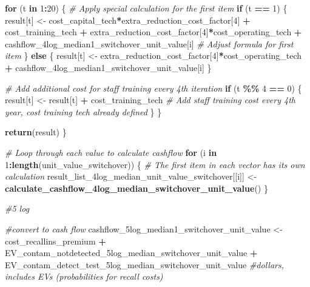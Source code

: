 \documentclass[
]{article}
\newenvironment{Shaded}{\begin{snugshade}}{\end{snugshade}}
\newcommand{\CommentTok}[1]{\textcolor[rgb]{0.56,0.35,0.01}{\textit{#1}}}
\newcommand{\ControlFlowTok}[1]{\textcolor[rgb]{0.13,0.29,0.53}{\textbf{#1}}}
\newcommand{\DecValTok}[1]{\textcolor[rgb]{0.00,0.00,0.81}{#1}}
\newcommand{\FunctionTok}[1]{\textcolor[rgb]{0.13,0.29,0.53}{\textbf{#1}}}
\newcommand{\NormalTok}[1]{#1}
\newcommand{\OtherTok}[1]{\textcolor[rgb]{0.56,0.35,0.01}{#1}}
\newcommand{\SpecialCharTok}[1]{\textcolor[rgb]{0.81,0.36,0.00}{\textbf{#1}}}
\begin{document}
\begin{Shaded}
\begin{Highlighting}[]
  \ControlFlowTok{for}\NormalTok{ (t }\ControlFlowTok{in} \DecValTok{1}\SpecialCharTok{:}\DecValTok{20}\NormalTok{) \{}
    \CommentTok{\# Apply special calculation for the first item}
    \ControlFlowTok{if}\NormalTok{ (t }\SpecialCharTok{==} \DecValTok{1}\NormalTok{) \{}
\NormalTok{      result[t] }\OtherTok{\textless{}{-}}\NormalTok{ cost\_capital\_tech}\SpecialCharTok{*}\NormalTok{extra\_reduction\_cost\_factor[}\DecValTok{4}\NormalTok{] }\SpecialCharTok{+}\NormalTok{ cost\_training\_tech }\SpecialCharTok{+}\NormalTok{ extra\_reduction\_cost\_factor[}\DecValTok{4}\NormalTok{]}\SpecialCharTok{*}\NormalTok{cost\_operating\_tech }\SpecialCharTok{+}\NormalTok{ cashflow\_4log\_median1\_switchover\_unit\_value[i] }\CommentTok{\# Adjust formula for first item}
\NormalTok{    \} }\ControlFlowTok{else}\NormalTok{ \{}
\NormalTok{      result[t] }\OtherTok{\textless{}{-}}\NormalTok{ extra\_reduction\_cost\_factor[}\DecValTok{4}\NormalTok{]}\SpecialCharTok{*}\NormalTok{cost\_operating\_tech }\SpecialCharTok{+}\NormalTok{ cashflow\_4log\_median1\_switchover\_unit\_value[i]}
\NormalTok{    \}}
    
    \CommentTok{\# Add additional cost for staff training every 4th iteration}
    \ControlFlowTok{if}\NormalTok{ (t }\SpecialCharTok{\%\%} \DecValTok{4} \SpecialCharTok{==} \DecValTok{0}\NormalTok{) \{}
\NormalTok{      result[t] }\OtherTok{\textless{}{-}}\NormalTok{ result[t] }\SpecialCharTok{+}\NormalTok{ cost\_training\_tech  }\CommentTok{\# Add staff training cost every 4th year, cost training tech already defined}
\NormalTok{    \}}
\NormalTok{  \}}
  
  \FunctionTok{return}\NormalTok{(result)}
\NormalTok{\}}

\CommentTok{\# Loop through each value to calculate cashflow}
\ControlFlowTok{for}\NormalTok{ (i }\ControlFlowTok{in} \DecValTok{1}\SpecialCharTok{:}\FunctionTok{length}\NormalTok{(unit\_value\_switchover)) \{}
  \CommentTok{\# The first item in each vector has its own calculation}
\NormalTok{  result\_list\_4log\_median\_unit\_value\_switchover[[i]] }\OtherTok{\textless{}{-}} \FunctionTok{calculate\_cashflow\_4log\_median\_switchover\_unit\_value}\NormalTok{()}
\NormalTok{\}}



\CommentTok{\#5 log }

\CommentTok{\#convert to cash flow}
\NormalTok{cashflow\_5log\_median1\_switchover\_unit\_value }\OtherTok{\textless{}{-}}\NormalTok{ cost\_recallins\_premium }\SpecialCharTok{+}\NormalTok{ EV\_contam\_notdetected\_5log\_median\_switchover\_unit\_value }\SpecialCharTok{+}\NormalTok{ EV\_contam\_detect\_test\_5log\_median\_switchover\_unit\_value }\CommentTok{\#dollars, includes EVs (probabilities for recall costs)}



\end{Highlighting}
\end{Shaded}
\end{document}
